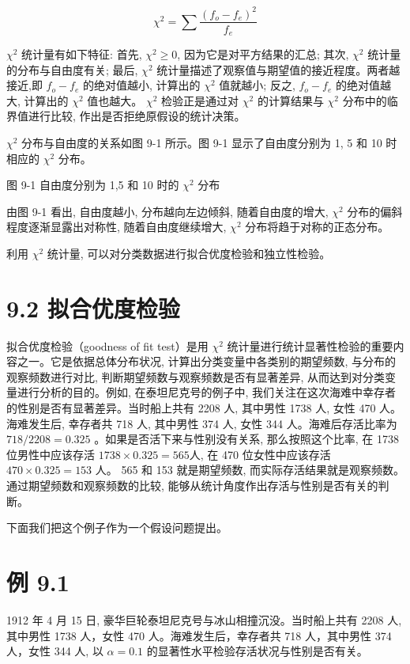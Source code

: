 \documentclass[10pt]{article}
\begin{document}
\begin{CJK*}{UTF8}{bsmi}
\begin{equation*}
\chi^{2}=\sum \frac{\left(f_{o}-f_{e}\right)^{2}}{f_{e}} \tag{9.1}
\end{equation*}


$\chi^{2}$ 统计量有如下特征: 首先, $\chi^{2} \geqslant 0$, 因为它是对平方结果的汇总; 其次, $\chi^{2}$ 统计量\\
的分布与自由度有关; 最后, $\chi^{2}$ 统计量描述了观察值与期望值的接近程度。两者越接近,即 $f_{o}-f_{e}$ 的绝对值越小, 计算出的 $\chi^{2}$ 值就越小; 反之, $f_{o}-f_{e}$ 的绝对值越大, 计算出的 $\chi^{2}$ 值也越大。 $\chi^{2}$ 检验正是通过对 $\chi^{2}$ 的计算结果与 $\chi^{2}$ 分布中的临界值进行比较, 作出是否拒绝原假设的统计决策。

$\chi^{2}$ 分布与自由度的关系如图 9-1 所示。图 9-1 显示了自由度分别为 1, 5 和 10 时相应的 $\chi^{2}$ 分布。

\begin{center}
\end{center}

图 9-1 自由度分别为 1,5 和 10 时的 $\chi^{2}$ 分布

由图 9-1 看出, 自由度越小, 分布越向左边倾斜, 随着自由度的增大, $\chi^{2}$ 分布的偏斜程度逐渐显露出对称性, 随着自由度继续增大, $\chi^{2}$ 分布将趋于对称的正态分布。

利用 $\chi^{2}$ 统计量, 可以对分类数据进行拟合优度检验和独立性检验。

\section*{9.2 拟合优度检验}
拟合优度检验（goodness of fit test）是用 $\chi^{2}$ 统计量进行统计显著性检验的重要内容之一。它是依据总体分布状况, 计算出分类变量中各类别的期望频数, 与分布的观察频数进行对比, 判断期望频数与观察频数是否有显著差异, 从而达到对分类变量进行分析的目的。例如, 在泰坦尼克号的例子中, 我们关注在这次海难中幸存者的性别是否有显著差异。当时船上共有 2208 人, 其中男性 1738 人, 女性 470 人。海难发生后, 幸存者共 718 人, 其中男性 374 人, 女性 344 人。海难后存活比率为 $718 / 2208=0.325$ 。如果是否活下来与性别没有关系, 那么按照这个比率, 在 1738 位男性中应该存活 $1738 \times 0.325=565$人, 在 470 位女性中应该存活 $470 \times 0.325=153$ 人。 565 和 153 就是期望频数, 而实际存活结果就是观察频数。通过期望频数和观察频数的比较, 能够从统计角度作出存活与性别是否有关的判断。

下面我们把这个例子作为一个假设问题提出。

\section*{例 9.1}
1912 年 4 月 15 日, 豪华巨轮泰坦尼克号与冰山相撞沉没。当时船上共有 2208 人,其中男性 1738 人，女性 470 人。海难发生后，幸存者共 718 人，其中男性 374 人，女性 344 人, 以 $\alpha=0.1$ 的显著性水平检验存活状况与性别是否有关。


\end{CJK*}
\end{document}
